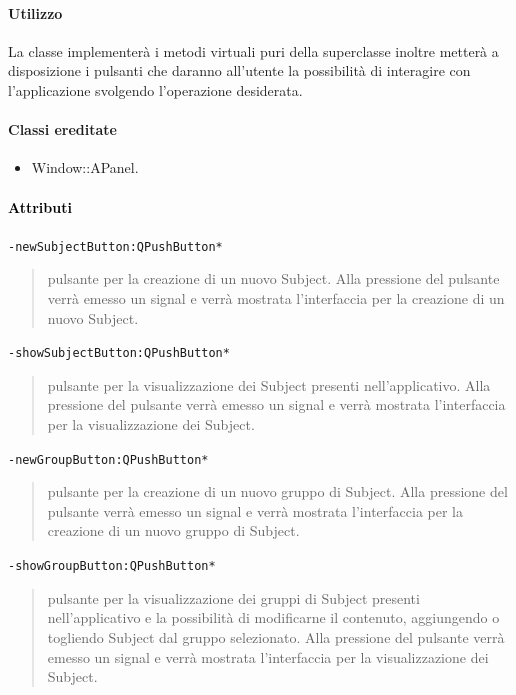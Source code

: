\paragraph{Utilizzo\\}
La classe implementerà i metodi virtuali puri della superclasse inoltre metterà a disposizione i pulsanti che daranno all'utente la possibilità di interagire con l'applicazione svolgendo l'operazione desiderata.
\paragraph{Classi ereditate\\}
\begin{itemize}
\item Window::APanel.
\end{itemize}
\paragraph{\textcolor{black}{Attributi\\}}
\color{teal}\verb!-newSubjectButton:QPushButton*!
\begin{quote}
\color{black}pulsante per la creazione di un nuovo Subject\g{}. Alla pressione del pulsante verrà emesso un signal\g{} e verrà mostrata l'interfaccia per la creazione di un nuovo Subject\g{}.
\end{quote} 
\color{teal}\verb!-showSubjectButton:QPushButton*!
\begin{quote}
\color{black}pulsante per la visualizzazione dei Subject\g{} presenti nell'applicativo. Alla pressione del pulsante verrà emesso un signal\g{} e verrà mostrata l'interfaccia per la visualizzazione dei Subject\g{}.
\end{quote}
\color{teal}\verb!-newGroupButton:QPushButton*!
\begin{quote}
\color{black}pulsante per la creazione di un nuovo gruppo di Subject\g{}. Alla pressione del pulsante verrà emesso un signal\g{} e verrà mostrata l'interfaccia per la creazione di un nuovo gruppo di Subject\g{}.
\end{quote} 
\color{teal}\verb!-showGroupButton:QPushButton*!
\begin{quote}
\color{black}pulsante per la visualizzazione dei gruppi di Subject\g{} presenti nell'applicativo e la possibilità di modificarne il contenuto, aggiungendo o togliendo Subject\g{} dal gruppo selezionato. Alla pressione del pulsante verrà emesso un signal\g{} e verrà mostrata l'interfaccia per la visualizzazione dei Subject\g{}.
\end{quote}
